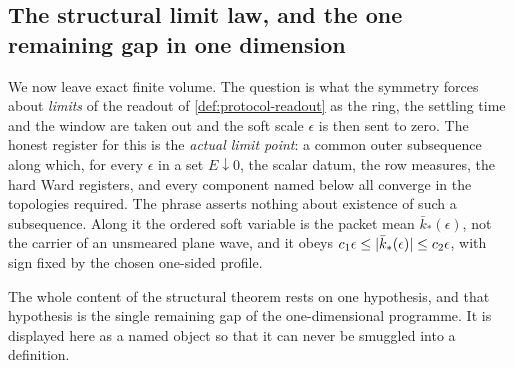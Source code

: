 
\subsection{The structural limit law, and the one remaining gap in one dimension}

We now leave exact finite volume. The question is what the symmetry forces
about \emph{limits} of the readout of \cref{def:protocol-readout} as the ring,
the settling time and the window are taken out and the soft scale $\epsilon$
is then sent to zero. The honest register for this is the \emph{actual limit
point}: a common outer subsequence along which, for every $\epsilon$ in a set
$E\downarrow0$, the scalar datum, the row measures, the hard Ward registers,
and every component named below all converge in the topologies required. The
phrase asserts nothing about existence of such a subsequence. Along it the
ordered soft variable is the packet mean $\bar k_*(\epsilon)$, not the carrier
of an unsmeared plane wave, and it obeys
$c_1\epsilon\le\lvert \bar k_*(\epsilon)\rvert\le c_2\epsilon$, with sign fixed by
the chosen one-sided profile.

The whole content of the structural theorem rests on one hypothesis, and that
hypothesis is the single remaining gap of the one-dimensional programme. It is
displayed here as a named object so that it can never be smuggled into a
definition.

